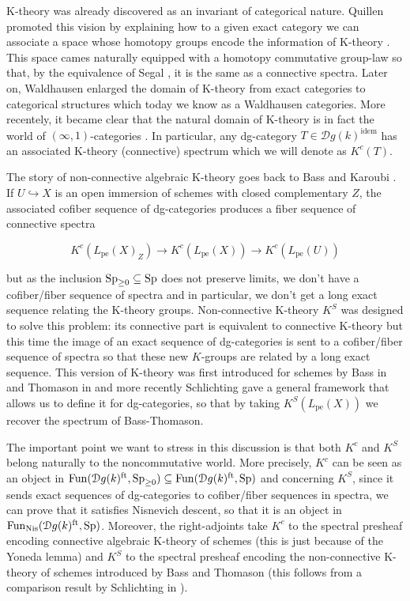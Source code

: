 \begin{refsection}
K-theory was already discovered as an invariant of categorical nature. Quillen promoted this vision by explaining how to a given exact category we can associate a space whose homotopy groups encode the information of K-theory \cite{MR0338129}. This space cames naturally equipped with a homotopy commutative group-law so that, by the equivalence of Segal \cite{MR0353298}, it is the same as a connective spectra. Later on, Waldhausen \cite{waldhausen-ktheoryofspaces} enlarged the domain of K-theory from exact categories to categorical structures which today we know as a Waldhausen categories. More recentely, it became clear that the natural domain of K-theory is in fact the world of $(\infty,1)$-categories \cite{toenvezzosi-remarkonKtheory,1204.3607}. In particular, any dg-category $T\in \mathcal{D}g(k)^\mathrm{idem}$ has an associated K-theory (connective) spectrum which we will denote as $K^c(T)$.




The story of non-connective algebraic K-theory goes back to Bass \cite{MR0249491} and Karoubi \cite{MR0233871}. If $U\hookrightarrow X$ is an open immersion of schemes with closed complementary $Z$, the associated cofiber sequence of dg-categories produces a fiber sequence of connective spectra

$$K^c(L_\mathrm{pe}(X)_Z)\to K^c(L_\mathrm{pe}(X))\to K^c(L_\mathrm{pe}(U))$$

\noindent but as the inclusion $\mathrm{Sp}_{\geq 0}\subseteq \mathrm{Sp}$ does not preserve limits,  we don't have a cofiber/fiber sequence of spectra and in particular, we don't get a long exact sequence relating the K-theory groups. Non-connective K-theory $K^S$ was designed to solve this problem: its connective part is equivalent to connective K-theory but this time the image of an exact sequence of dg-categories is sent to a cofiber/fiber sequence of spectra so that these new $K$-groups are related by a long exact sequence. This version of K-theory was first introduced for schemes by Bass in \cite{MR0249491} and Thomason in \cite{thomasonalgebraic} and more recently Schlichting \cite{schlichting-negative} gave a general framework that allows us to define it for dg-categories, so that by taking $K^S(L_\mathrm{pe}(X))$ we recover the spectrum of Bass-Thomason. 

The important point we want to stress in this discussion is that both $K^c$ and $K^S$ belong naturally to the noncommutative world. More precisely, $K^c$ can be seen as an object in $\mathrm{Fun}(\mathcal{D}g(k)^\mathrm{ft}, \mathrm{Sp}_{\geq 0})\subseteq \mathrm{Fun}(\mathcal{D}g(k)^\mathrm{ft}, \mathrm{Sp})$ and concerning $K^S$, since it sends exact sequences of dg-categories to cofiber/fiber sequences in spectra, we can prove that it satisfies Nisnevich descent, so that it is an object in $\mathrm{Fun}_\mathrm{Nis}(\mathcal{D}g(k)^\mathrm{ft}, \mathrm{Sp})$. Moreover, the right-adjoints take $K^c$ to the spectral presheaf encoding connective algebraic K-theory of schemes (this is just because of the Yoneda lemma) and $K^S$ to the spectral presheaf encoding the non-connective K-theory of schemes introduced by Bass and Thomason (this follows from a comparison result by Schlichting in \cite{schlichting-negative}).\\ 


\end{refsection}
